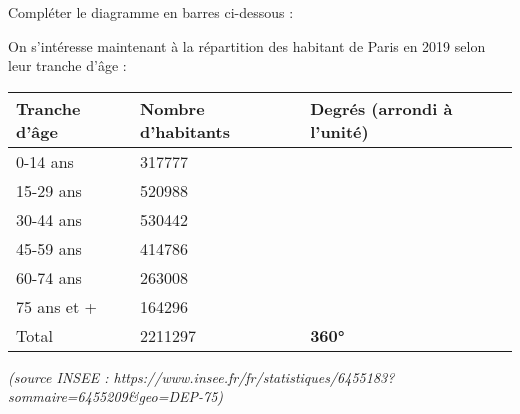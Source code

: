 \documentclass[../Cours.tex]{subfiles}
\begin{document}
\begin{questions}
    \question Compléter le diagramme en barres ci-dessous : 
    \begin{center}
    \end{center}

    On s'intéresse maintenant à la répartition des habitant de Paris en 2019 selon leur tranche d'âge :  
    \begin{center}
        \begin{tabularx}{0.8\linewidth}{|l|X|X|}\hline
        Tranche d'âge & Nombre d'habitants & Degrés (arrondi à l'unité) \\\hline\hline
        0-14 ans & \num{317777} &  \\\hline
        15-29 ans & \num{520988} &  \\\hline
        30-44 ans & \num{530442} &  \\\hline
        45-59 ans & \num{414786} &  \\\hline
        60-74 ans & \num{263008} &  \\\hline
        75 ans et + & \num{164296} & \\\hline
        Total & \num{2211297} & \textbf{\ang{360}} \\\hline
        \end{tabularx}
        \begin{flushright}\vspace{-0.8em}
            \textit{(source INSEE : \tiny{https://www.insee.fr/fr/statistiques/6455183?sommaire=6455209\&geo=DEP-75})}
        \end{flushright}
    \end{center}


\end{questions}
\end{document}
